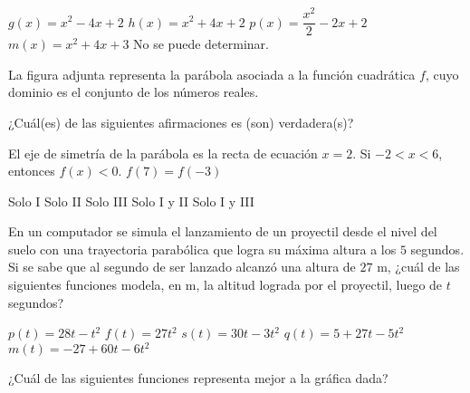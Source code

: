 \documentclass[borrador]{srs3}
\begin{document}
\begin{preguntas}
\begin{alternativas}
\alternativa \( g\left(x\right)=x^2-4x+2 \)
\alternativa \( h\left(x\right)=x^2+4x+2 \)
\alternativa \( p\left(x\right)=\dfrac{x^2}{2}-2x+2 \)
\alternativa \( m\left(x\right)=x^2+4x+3 \)
\alternativa No se puede determinar.
\end{alternativas}
\pregunta La figura adjunta representa la parábola asociada a la función cuadrática \(f\), cuyo dominio es el conjunto de los números reales.
\begin{columnas}
¿Cuál(es) de las siguientes afirmaciones es (son) verdadera(s)?
\begin{opciones}
\opcion El eje de simetría de la parábola es la recta de ecuación \( x=2 \).
\opcion Si \(-2 < x < 6\), entonces \(f\left(x\right)<0\).
\opcion \( f\left(7\right) = f\left(-3\right) \)
\end{opciones}
\begin{alternativas}
\alternativa Solo I
\alternativa Solo II
\alternativa Solo III
\alternativa Solo I y II
\alternativa Solo I y III
\end{alternativas}
\siguiente
{}
\end{columnas}
\pregunta En un computador se simula el lanzamiento de un proyectil desde el nivel del suelo con una trayectoria parabólica que logra su máxima altura a los \(5\) segundos. Si se sabe que al segundo de ser lanzado alcanzó una altura de \(27\) m, ¿cuál de las siguientes funciones modela, en m, la altitud lograda por el proyectil, luego de \(t\) segundos?
\begin{alternativas}
\alternativa \( p\left(t\right)=28t-t^2 \)
\alternativa \( f\left(t\right)=27t^2 \)
\alternativa \( s\left(t\right)=30t-3t^2 \)
\alternativa \( q\left(t\right)=5+27t-5t^2 \)
\alternativa \( m\left(t\right)=-27+60t-6t^2 \)
\end{alternativas}
\pregunta ¿Cuál de las siguientes funciones representa mejor a la gráfica dada?
\begin{columnas}[0.5][t]

\end{columnas}
\end{preguntas}
\end{document}
